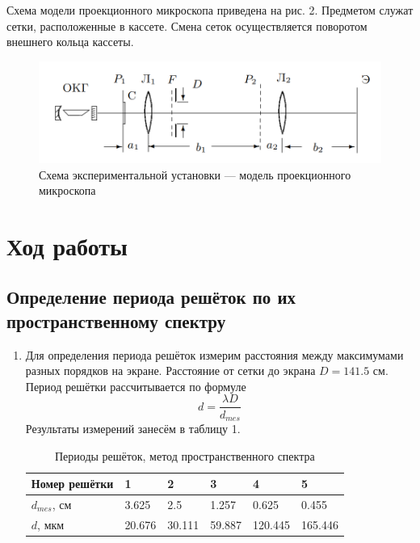 \documentclass[a4paper]{article}
\begin{document}
Схема модели проекционного микроскопа приведена на рис. 2. Предметом служат сетки, расположенные
в кассете. Смена сеток осуществляется поворотом внешнего кольца кассеты.

    \begin{figure}[h]
    \centering
    \includegraphics[width=15cm]{fig1.PNG}
    \caption{Схема экспериментальной установки — модель проекционного
микроскопа}
    \label{fig:vac}
\end{figure}

\section{Ход работы}
\subsection{Определение периода решёток по их пространственному спектру}
\begin{enumerate}
    \item Для определения периода решёток измерим расстояния между максимумами разных порядков на экране. Расстояние от сетки до экрана $D = 141.5$ см. Период решётки рассчитывается по формуле 
    \begin{equation}
        d = \frac{\lambda D}{d_{mes}}
    \end{equation}
    Результаты измерений занесём в таблицу 1.
    
        \begin{table}[h]
    \centering
    \begin{center}
    \caption{Периоды решёток, метод пространственного спектра}
    \end{center}
    \vspace{0.1cm}
    \label{tab:my_label}
    \begin{tabular}{ |p{2.5cm}||p{1cm}|p{1cm}|p{1cm}|p{1cm}|p{1cm}|}
 \hline
Номер решётки & 1 & 2 & 3 & 4 & 5\\
 \hline
 $d_{mes}$, см & 3.625 & 2.5 & 1.257 & 0.625 & 0.455 \\
 \hline
 $d$, мкм & 20.676 & 30.111 & 59.887 & 120.445 & 165.446\\

 \hline
 
\end{tabular}
\end{table}
\end{enumerate}
\end{document}
